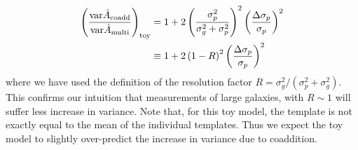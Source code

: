 \documentclass[fleqn,useAMS,usenatbib]{mnras}
\newcommand{\coadd}{{\rm coadd}}
\begin{document}
\begin{align} \label{eq:vargal_appendix}
\left( \frac{ {\rm var} \hat{A}_\coadd }{{\rm var} \hat{A}_{\rm multi} } 
\right)_{\rm toy} &= 
1 + 2 \left( \frac{\sigma_p^2}{\sigma_g^2 + \sigma_p^2}\right)^2 \left( 
\frac{\Delta \sigma_p}{\sigma_p} \right)^2 \\
&\equiv 1 + 2 \left( 1 - R \right)^2 \left( \frac{\Delta 
\sigma_p}{\sigma_p} \right)^2
\end{align}
where we have used the definition of the resolution factor $R =
\sigma_g^2/(\sigma_p^2 + \sigma_g^2)$.  This confirms our
intuition that measurements of large galaxies, with $R \sim 1$ will suffer
less increase in variance.
Note that, for this toy model, the template is not exactly equal to the mean of
the individual templates.  Thus we expect the toy model to slightly
over-predict the increase in variance due to coaddition.
\end{document}
